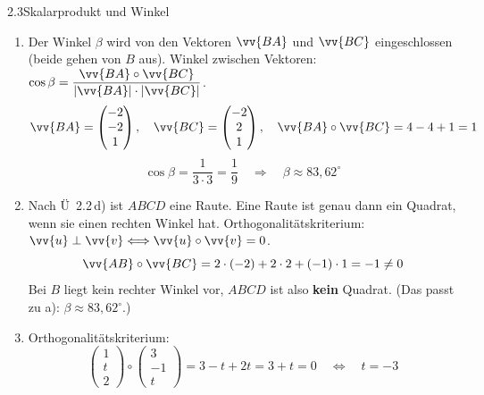
\begin{loesung}{2.3}{Skalarprodukt und Winkel}
\begin{enumerate}[label=\alph*)]
  \item Der Winkel $\beta$ wird von den Vektoren $\vv{BA}$ und $\vv{BC}$ eingeschlossen (beide gehen von $B$ aus). Winkel zwischen Vektoren: $\cos{\beta} = \dfrac{\vv{BA}\circ\vv{BC}}{|\vv{BA}|\cdot|\vv{BC}|}$.
  \[\vv{BA} = \begin{pmatrix} -2\\ -2\\ 1\end{pmatrix},\quad \vv{BC} = \begin{pmatrix} -2\\ 2\\ 1\end{pmatrix},\quad \vv{BA}\circ\vv{BC} = 4-4+1 = 1\]
  \[\cos{\beta} = \dfrac{1}{3\cdot 3} = \dfrac{1}{9}\quad\Longrightarrow\quad\beta\approx 83{,}62^{\circ}\]
  \item Nach Ü~2.2\,d) ist $ABCD$ eine Raute. Eine Raute ist genau dann ein Quadrat, wenn sie einen rechten Winkel hat. Orthogonalitätskriterium: $\vv{u}\perp\vv{v}\Longleftrightarrow\vv{u}\circ\vv{v}=0$.
  \[\vv{AB}\circ\vv{BC} = 2\cdot(-2)+2\cdot 2+(-1)\cdot 1 = -1\neq 0\]
  Bei $B$ liegt kein rechter Winkel vor, $ABCD$ ist also \textbf{kein} Quadrat. (Das passt zu a): $\beta\approx 83{,}62^{\circ}$.)
  \item Orthogonalitätskriterium:
  \[\begin{pmatrix} 1\\ t\\ 2\end{pmatrix}\circ\begin{pmatrix} 3\\ -1\\ t\end{pmatrix} = 3-t+2t = 3+t = 0\quad\Longleftrightarrow\quad t = -3\]
\end{enumerate}
\end{loesung}

